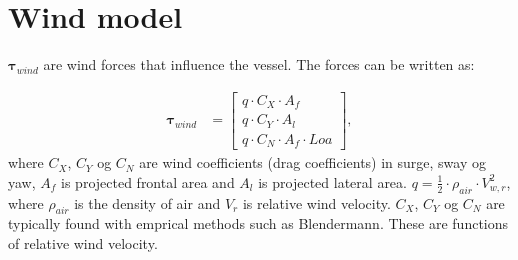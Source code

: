 \documentclass[a4paper]{article}
\begin{document}
\section{Wind model}

$\boldsymbol{\tau}_{wind}$  are wind forces that influence the vessel. The forces can be written as:

\begin{equation}
\label{eq:vindkrefter}
\begin{aligned}
	\boldsymbol{\tau}_{wind} &=
		\left[ \begin{array}{ccc}
			q \cdot C_X \cdot  A_f \\
			q  \cdot C_Y \cdot A_l \\
			q  \cdot C_N \cdot A_f \cdot Loa
		\end{array} \right],
\end{aligned}
\end{equation}
%
where $C_X$, $C_Y$ og $C_N$ are wind coefficients (drag coefficients) in surge, sway og yaw, $A_f$ is projected frontal area and $A_l$ is projected lateral area.
$q = \frac{1}{2} \cdot \rho_{air} \cdot V_{w,r}^2$, where $\rho_{air}$ is the density of air and $V_r$ is relative wind velocity.
$C_X$, $C_Y$ og $C_N$ are typically found with emprical methods such as Blendermann. These are functions of relative wind velocity.
\end{document}
